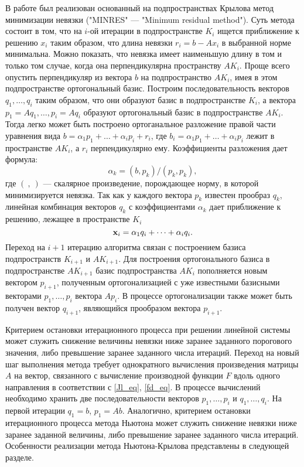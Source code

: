 В работе был реализован основанный на подпространствах Крылова метод минимизации невязки ("MINRES" --- "Minimum residual method")\cite{EEbook}. Суть метода состоит в том, что на $i$-ой итерации в подпространстве $K_i$ ищется приближение к решению $x_i$ таким образом, что длина невязки $r_i = b - Ax_i$ в выбранной норме минимальна. Можно показать, что невязка имеет наименьшую длину в том и только том случае, когда она перпендикулярна пространству $AK_i$. Проще всего опустить перпендикуляр из вектора $b$ на подпространство $AK_i$, имея в этом подпространстве ортогональный базис. Построим последовательность векторов $q_1, \dots, q_i$ таким образом, что они образуют базис в подпространстве $K_i$, а вектора $p_1 = Aq_1, \dots, p_i = Aq_i$ образуют ортогональный базис в подпространстве $AK_i$. Тогда легко может быть построено ортоганальное разложение правой части уравнения вида $b = \alpha_1 p_1 + \dots + \alpha_i p_i + r_i$, где $b_i =  \alpha_1 p_1 + \dots + \alpha_i p_i$ лежит в пространстве $AK_i$, а $r_i$ перпендикулярно ему. Коэффициенты разложения дает формула:
\begin{equation}
\alpha_k = (b,p_k) / (p_k, p_k),
\end{equation}
где $(\ ,\ )$ ---  скалярное произведение, порождающее норму, в которой минимизируется невязка. 
Так как у каждого вектора $p_k$ известен прообраз $q_k$, линейная комбинация векторов $q_k$ с коэффициентами $\alpha_k$ дает приближение к решению, лежащее в пространстве $K_i$
\begin{equation}
\mathbf{x}_i = \alpha_1 q_i + \dots + \alpha_i q_i. 
\end{equation}
Переход на $i+1$ итерацию алгоритма связан с построением базиса подпространств $K_{i+1}$ и $AK_{i+1}$. Для построения ортогонального базиса в подпространстве $AK_{i+1}$ базис подпространства $AK_i$ пополняется новым вектором $p_{i+1}$, полученным ортогонализацией с уже известными базисными векторами $p_1, \dots, p_i$ вектора $Ap_i$. В процессе ортогонализации также может быть получен вектор $q_{i+1}$, являющийся прообразом вектора $p_{i+1}$. 

Критерием остановки итерационного процесса при решении линейной системы может служить снижение величины невязки ниже заранее заданного порогового значения, либо превышение заранее заданного числа итераций. Переход на новый шаг выполнения метода требует однократного вычисления произведения матрицы $A$ на вектор, связанного с вычисление производной функции $F$ вдоль одного направления в соответствии с \eqref{Jl_eq}, \eqref{fd_eq}. В процессе вычислений необходимо хранить две последовательности векторов $p_1, \dots, p_i$ и $q_1, \dots, q_i$. На первой итерации $q_1 = b$, $p_1 = Ab$. Аналогично, критерием остановки итерационного процесса метода Ньютона может служить снижение невязки ниже заранее заданной величины, либо превышение заранее заданного числа итераций. Особенности реализации метода Ньютона-Крылова представлены в следующей разделе.  


